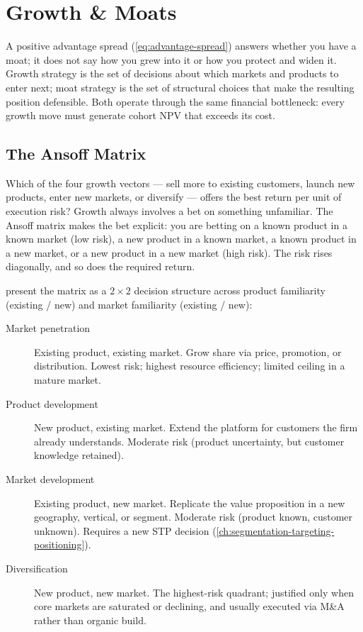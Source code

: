 \chapter{Growth \& Moats}\label{ch:growth}


A positive advantage spread (\cref{eq:advantage-spread}) answers whether you have a moat;
it does not say how you grew into it or how you protect and widen it. Growth strategy is
the set of decisions about which markets and products to enter next; moat strategy is the
set of structural choices that make the resulting position defensible. Both operate through
the same financial bottleneck: every growth move must generate cohort NPV that exceeds its
cost.

\section{The Ansoff Matrix}\label{sec:ansoff-matrix}

Which of the four growth vectors --- sell more to existing customers, launch new products,
enter new markets, or diversify --- offers the best return per unit of execution risk? Growth
always involves a bet on something unfamiliar. The Ansoff matrix makes the bet explicit: you
are betting on a known product in a known market (low risk), a new product in a known market,
a known product in a new market, or a new product in a new market (high risk). The risk rises
diagonally, and so does the required return.

\textcite{kotler2021} present the matrix as a \(2\times2\) decision structure across
product familiarity (existing / new) and market familiarity (existing / new):
\begin{description}
  \item[Market penetration] Existing product, existing market. Grow share via price,
        promotion, or distribution. Lowest risk; highest resource efficiency; limited
        ceiling in a mature market.
  \item[Product development] New product, existing market. Extend the platform for
        customers the firm already understands. Moderate risk (product uncertainty, but
        customer knowledge retained).
  \item[Market development] Existing product, new market. Replicate the value proposition
        in a new geography, vertical, or segment. Moderate risk (product known, customer
        unknown). Requires a new STP decision (\cref{ch:segmentation-targeting-positioning}).
  \item[Diversification] New product, new market. The highest-risk quadrant; justified only
        when core markets are saturated or declining, and usually executed via M\&A rather
        than organic build.
\end{description}

